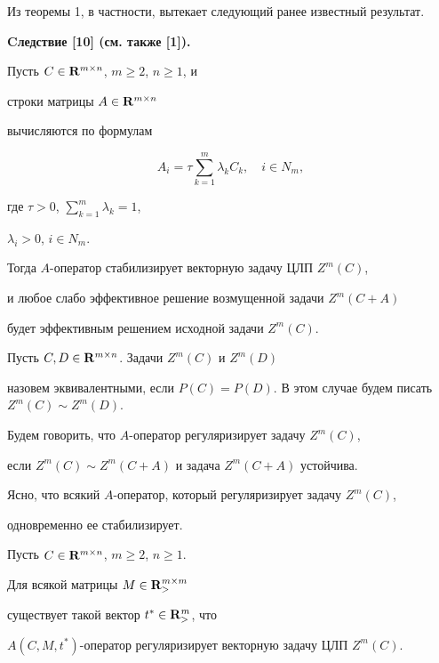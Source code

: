 Из теоремы 1, в частности, вытекает следующий ранее известный результат.


\medskip





{\bf Cледствие [10] (см. также [1]).}


Пусть $C\in {\bold R}^{m\times n}$, $m\ge 2$, $n\ge 1$, и


строки матрицы $A\in {\bold R}^{m\times n}$


вычисляются по формулам


$$


A_i=\tau\sum_{k=1}^m\lambda_kC_k,\quad i\in N_m,


$$


где $\tau>0$, $\sum\limits_{k=1}^m\lambda_k=1$,


$\lambda_i>0$, $i\in N_m$.


Тогда $A$-оператор стабилизирует векторную задачу ЦЛП $Z^m(C)$,


и любое слабо эффективное решение возмущенной задачи $Z^m(C+A)$


будет эффективным решением исходной задачи $Z^m(C)$.


\medskip





Пусть $C, D\in {\bold R}^{m\times n}$. Задачи $Z^m(C)$ и $Z^m(D)$


назовем эквивалентными, если $P(C)=P(D)$. В этом случае будем писать $Z^m(C)


\sim Z^m(D)$.





Будем говорить, что $A$-оператор регуляризирует задачу $Z^m(C)$,


если $Z^m(C)\sim Z^m(C+A)$ и задача $Z^m(C+A)$ устойчива.


Ясно, что всякий $A$-оператор, который регуляризирует задачу $Z^m(C)$,


одновременно ее стабилизирует.





\begin{thm}


Пусть $C\in {\bold R}^{m\times n}$, $m\ge 2$, $n\ge 1$.


Для всякой матрицы $M\in {\bold R}_>^{m\times m}$


существует такой вектор $t^*\in {\bold R}_>^m$, что


$A(C, M, t^*)$-оператор регуляризирует векторную задачу ЦЛП $Z^m(C)$.


\end{thm}





